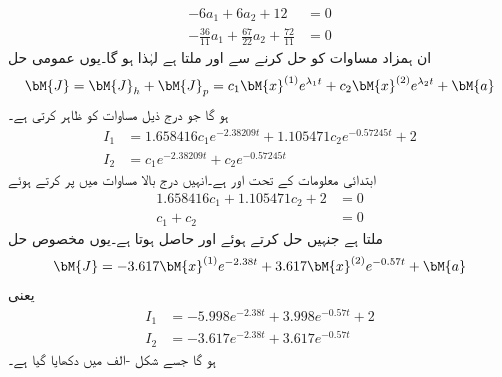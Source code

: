 \begin{align*}
-6a_1+6a_2+12&=0\\
-\frac{36}{11}a_1+\frac{67}{22}a_2+\frac{72}{11}&=0
\end{align*}
ان ہمزاد مساوات کو حل کرنے سے  اور  ملتا ہے لہٰذا  ہو گا۔یوں عمومی حل
\begin{align*}
\bM{J}=\bM{J}_h+\bM{J}_p=c_1\bM{x}^{(1)}e^{\lambda_1 t}+c_2 \bM{x}^{(2)}e^{\lambda_2 t}+\bM{a}
\end{align*}
ہو گا جو درج ذیل مساوات کو ظاہر کرتی ہے۔
\begin{align*}
I_1&=1.658416c_1e^{-2.38209 t}+1.105471c_2e^{-0.57245t}+2\\
I_2&=c_1e^{-2.38209t}+c_2e^{-0.57245t}
\end{align*}
ابتدائی معلومات کے تحت  اور  ہے۔انہیں درج بالا مساوات میں پر کرتے  ہوئے
\begin{align*}
1.658416c_1+1.105471c_2+2&=0\\
c_1+c_2&=0
\end{align*}
ملتا ہے جنہیں حل کرتے ہوئے  اور  حاصل ہوتا ہے۔یوں مخصوص حل 
\begin{align*}
\bM{J}=-3.617\bM{x}^{(1)}e^{-2.38t}+3.617\bM{x}^{(2)}e^{-0.57t}+\bM{a}
\end{align*}
یعنی
\begin{align*}
I_1&=-5.998e^{-2.38 t}+3.998e^{-0.57t}+2\\
I_2&=-3.617e^{-2.38t}+3.617e^{-0.57t}
\end{align*}
ہو گا جسے شکل -الف میں دکھایا گیا ہے۔
